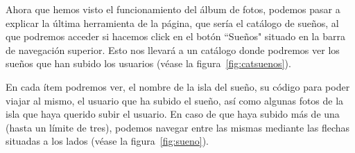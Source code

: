 
\clearpage

Ahora que hemos visto el funcionamiento del álbum de fotos, podemos pasar a explicar la última herramienta de la página, que sería el catálogo de sueños, al que podremos acceder si hacemos click en el botón ``Sueños" situado en la barra de navegación superior. Esto nos llevará a un catálogo donde podremos ver los sueños que han subido los usuarios {(v\'ease la figura~\ref{fig:catsuenos})}.\\


En cada ítem podremos ver, el nombre de la isla del sueño, su código para poder viajar al mismo, el usuario que ha subido el sueño, así como algunas fotos de la isla que haya querido subir el usuario. En caso de que haya subido más de una (hasta un límite de tres), podemos navegar entre las mismas mediante las flechas situadas a los lados {(v\'ease la figura~\ref{fig:sueno})}.\\

